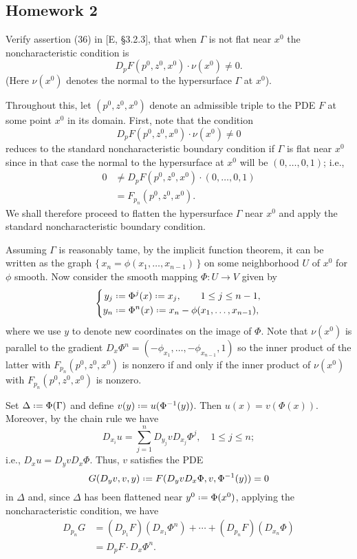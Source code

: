 \subsection{Homework 2}
\begin{problem}
  Verify assertion (36) in [E, \S 3.2.3], that when \(\Gamma\) is not flat
  near \(x^0\) the noncharacteristic condition is
  \[
    D_pF(p^0,z^0,x^0)\cdot \nu(x^0)\neq 0.
  \]
  (Here \(\nu(x^0)\) denotes the normal to the hypersurface \(\Gamma\) at
  \(x^0\)).
\end{problem}
\begin{solution*}
  Throughout this, let \((p^0,z^0,x^0)\) denote an admissible triple to the
  PDE \(F\) at some point \(x^0\) in its domain. First, note that the
  condition
  \[
    D_pF(p^0,z^0,x^0)\cdot \nu(x^0)\neq 0
  \]
  reduces to the standard noncharacteristic boundary condition if
  \(\Gamma\) is flat near \(x^0\) since in that case the normal to the
  hypersurface at \(x^0\) will be \((0,\dotsc,0,1)\); i.e.,
  \begin{align*}
    0&\neq D_pF(p^0,z^0,x^0)\cdot (0,\dotsc,0,1)\\
     &=F_{p_n}(p^0,z^0,x^0).
  \end{align*}
  We shall therefore proceed to flatten the hypersurface \(\Gamma\) near
  \(x^0\) and apply the standard noncharacteristic boundary condition.

  Assuming \(\Gamma\) is reasonably tame, by the implicit function theorem,
  it can be written as the graph \(\{\,x_n=\phi(x_1,\dotsc,x_{n-1})\,\}\)
  on some neighborhood \(U\) of \(x^0\) for \(\phi\) smooth. Now consider
  the smooth mapping \(\Phi\colon U\to V\) given by
  \[
    \left\{
      \begin{aligned}
        y_j&\defeq \Phi^j(x)\defeq x_j,\qquad 1\leq j\leq n-1,\\
        y_n&\defeq \Phi^n(x)\defeq x_n-\phi(x_1,\dotsc,x_{n-1}),
      \end{aligned}
    \right.
  \]
  where we use \(y\) to denote new coordinates on the image of
  \(\Phi\). Note that \(\nu(x^0)\) is parallel to the gradient
  \(D_x\Phi^n=(-\phi_{x_1},\dotsc,-\phi_{x_{n-1}},1)\) so the inner product
  of the latter with \(F_{p_n}(p^0,z^0,x^0)\) is nonzero if and only if the
  inner product of \(\nu(x^0)\) with \(F_{p_n}(p^0,z^0,x^0)\) is nonzero.

  Set \(\Delta\defeq\Phi(\Gamma)\) and define
  \(v(y)\defeq u(\Phi^{-1}(y))\). Then \(u(x)=v(\Phi(x))\). Moreover, by
  the chain rule we have
  \[
    D_{x_i}u=\sum_{j=1}^n D_{y_j} vD_{x_j}\Phi^j,\quad 1\leq j\leq n;
  \]
  i.e., \(D_x u=D_y v D_x\Phi\). Thus, \(v\) satisfies the PDE
  \[
    G(D_yv,v,y)\defeq F(D_yvD_x\Phi,v,\Phi^{-1}(y))=0
  \]
  in \(\Delta\) and, since \(\Delta\) has been flattened near
  \(y^0\defeq\Phi(x^0)\), applying the noncharacteristic condition, we have
  \begin{align*}
    D_{p_n}G
    &=(D_{p_1}F)(D_{x_1}\Phi^n)+\dotsb+(D_{p_n}F)(D_{x_n}\Phi)\\
    &=D_pF\cdot D_x\Phi^n.
  \end{align*}


\end{solution*}
